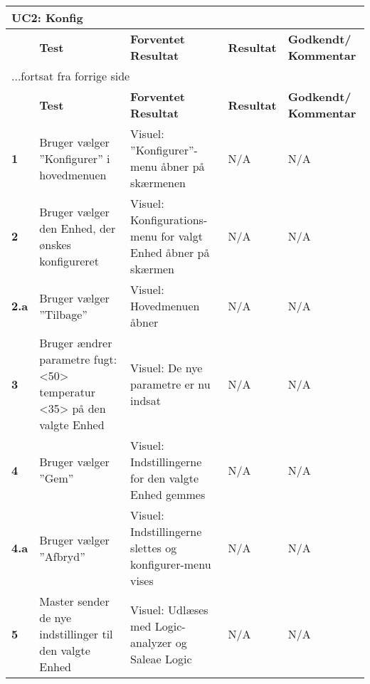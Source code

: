 \begin{center}
\begin{longtable}{|p{}|p{}|p{}|p{}|p{}|} %
\hline
\multicolumn{5}{|l|}{\textbf{UC2: Konfig}} \\ \hline
\multicolumn{1}{|c|}{} &
\textbf{Test} &
\textbf{Forventet \newline Resultat} &
\textbf{Resultat} &
\textbf{Godkendt/ \newline Kommentar} \\ \hline 
\endfirsthead

\multicolumn{5}{l}{...fortsat fra forrige side} \\ \hline 
\multicolumn{1}{|c|}{} &
\textbf{Test} &
\textbf{Forventet \newline Resultat} &
\textbf{Resultat} &
\textbf{Godkendt/ \newline Kommentar} \\ \hline 
\endhead

\textbf{1}	&Bruger vælger ''Konfigurer'' i hovedmenuen
			&Visuel: ''Konfigurer''-menu åbner på skærmenen
			&N/A 
			&N/A \\ \hline 
			
\textbf{2}	&Bruger vælger den Enhed, der ønskes konfigureret
			&Visuel: Konfigurations-menu for valgt Enhed åbner på skærmen
			&N/A
			&N/A \\ \hline 
			
\textbf{2.a}	&Bruger vælger ''Tilbage''
			&Visuel: Hovedmenuen åbner
			&N/A
			&N/A \\ \hline 
			
\textbf{3}	&Bruger ændrer parametre fugt: <50> temperatur <35> på den valgte Enhed 
			&Visuel: De nye parametre er nu indsat
			&N/A
			&N/A \\ \hline 
			
\textbf{4}	&Bruger vælger ''Gem'' 
			&Visuel: Indstillingerne for den valgte Enhed gemmes
			&N/A
			&N/A \\ \hline 
			
\textbf{4.a}	&Bruger vælger ''Afbryd''
			&Visuel: Indstillingerne slettes og konfigurer-menu vises
			&N/A
			&N/A \\ \hline 
			
\textbf{5}	&Master sender de nye indstillinger til den valgte Enhed
			&Visuel: Udlæses med Logic-analyzer og Saleae Logic
			&N/A
			&N/A \\ \hline 
			
\end{longtable}
	\label{ATUC2} 
\end{center}